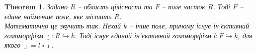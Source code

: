 \documentclass[a4paper, 10pt]{article}
\theoremstyle{theoremdd}
\newtheorem{theorem}{Theorem}[subsection]
\theoremstyle{theoremdd}
\theoremstyle{theoremdd}
\theoremstyle{theoremdd}
\theoremstyle{theoremdd}
\theoremstyle{theoremdd}
\theoremstyle{theoremdd}
\theoremstyle{theoremdd}
\theoremstyle{theoremdd}
\theoremstyle{theoremdd}
\theoremstyle{theoremdd}
\theoremstyle{theoremdd}
\theoremstyle{theoremdd}
\theoremstyle{theoremdd}
\theoremstyle{theoremdd}
\begin{document}
\begin{theorem}
\label{field_of_fractions_the_smallest}
Задано $R$ -- область цілісності та $F$ -- поле часток $R$. Тоді $F$ -- єдине найменше поле, яке містить $R$.\\
Математично це звучить так. Нехай $k$ -- інше поле, причому існує ін'єктивний гомоморфізм $\jmath \colon R \hookrightarrow k$. Тоді існує єдиний ін'єктивний гомоморфізм $l \colon F \hookrightarrow k$, для якого $\jmath = l \circ \imath$.
\begin{figure}[H]
\centering
{}
\end{figure}
\end{theorem}
\end{document}
